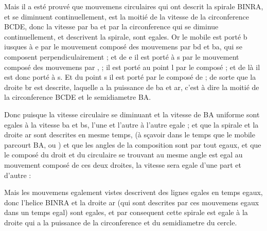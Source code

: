 \documentclass[11pt,a4paper]{article}
\begin{document}

Mais il a esté prouvé que   mouvemens circulaires qui ont descrit la spirale BINRA, et se diminuent continuellement, est la moitié de la vitesse de la circonference BCDE, donc la vitesse par ba et par la circonference qui se diminue continuellement, et descrivent la spirale, sont egales. Or le mobile est porté  b iusques à e par le mouvement composé des mouvemens par bd et ba, qui se composent \struck{\ill{}} perpendiculairement ; et de e il est porté à s par le mouvement composé des mouvemens par ,  ; il est porté au point l par le composé \struck{\ill{}}  ; et de là il est donc porté à s. Et du point s il est porté par le composé de  ; de sorte que la droite br est descrite, laquelle a la puissance de ba et ar, c'est à dire la moitié de la circonference BCDE et le semidiametre BA.

Donc puisque la vitesse circulaire se diminuant et la vitesse de BA uniforme sont egales à la vitesse ba et bs, l'une et l'autre à l'autre egale ; et que la spirale et la droite ar sont descrites en mesme temps, (à sçavoir dans le temps que le mobile parcourt BA, ou ) et que les angles de la composition sont par tout egaux, et que le composé du droit et du circulaire se trouvant au mesme angle est egal au mouvement composé de ces deux droites, la vitesse sera egale d'une part et d'autre :

Mais les mouvemens \struck{\ill{}} egalement vistes descrivent des lignes egales en temps egaux, donc l'helice BINRA et la droite ar (qui sont descrites par ces mouvemens egaux dans un temps egal) sont egales, et par consequent  cette spirale est egale à la droite qui  a la puissance de la circonference et du \struck{\ill{}} semidiametre du cercle.
\end{document}

